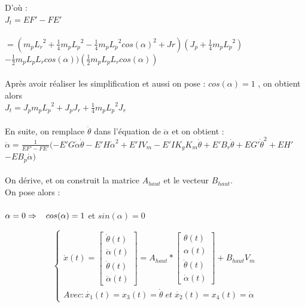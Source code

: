 \documentclass[12pt, a4paper, openany]{report}
\begin{document}
D'où :\\

$J_{t} = E{F}'-F{E}'$\\\\ $=(m_{p}{L_{r}}^2+\frac{1}{4}m_{p}{L_{p}}^2-\frac{1}{4}m_{p}{L_{p}}^2cos({\alpha})^2+Jr)(J_{p}+\frac{1}{4}m_{p}{L_{p}}^2)$\\
$-\frac{1}{2}m_{p}L_{p}L_{r}cos(\alpha))(\frac{1}{2}m_{p}L_{p}L_{r}cos(\alpha))$\\\\


Après avoir réaliser les simplification et aussi on pose :  $cos(\alpha)=1$ , on obtient alors \\


     $J_{t}=J_{p}m_{p}{L_{p}}^2+J_{p}J_{r}+\frac{1}{4}m_{p}{L_{p}}^2J_{r}$\\\\


 En suite, on remplace $\ddot{\theta}$ dans l'équation de $\ddot{\alpha}$ et on obtient :\\

    $\ddot{\alpha}=\frac{1}{E{F}'-F{E}'}(-{E}'G\dot{\alpha}\dot{\theta}-{E}'H\dot{\alpha}^2+{E}'IV_{m}-{E}'IK_{g}K_{m}\dot{\theta}+{E}'B_{r}\dot{\theta}+E{G}'\dot{\theta}^2+E{H}'$\\$-EB_{p}\dot{\alpha})$\\\\


On dérive, et on construit la matrice $A_{haut}$ et le vecteur $B_{haut}$.\\
On pose alors :\\\\

$\alpha = 0 \Rightarrow \hspace{3mm} cos(\alpha) = 1$ et $sin(\alpha) = 0$ 


\begin{equation*}
\left\{\begin{matrix}
\dot{x}(t) = \begin{bmatrix}
\dot{\theta}(t)\\ 
\dot{\alpha}(t)\\ 
\ddot{\theta}(t)\\ 
\ddot{\alpha}(t)
\end{bmatrix} = A_{haut}*\begin{bmatrix}
\theta(t)\\ 
\alpha(t)\\ 
\dot{\theta}(t)\\ 
\dot{\alpha}(t)
\end{bmatrix} + B_{haut} V_m\\ 

Avec : \dot{x_1}(t) = x_3(t) = \dot{\theta}\; et \; \dot{x_2}(t) = x_4(t) = \dot{\alpha}
\end{matrix}\right.
\end{equation*}
\end{document}
